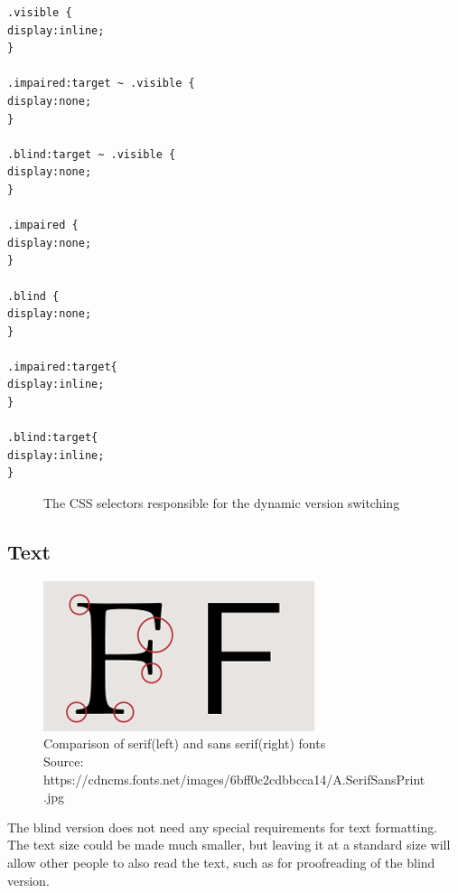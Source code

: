 \vspace{1cm}
\begin{lstlisting}
.visible {
display:inline; 
}

.impaired:target ~ .visible {
display:none; 
}

.blind:target ~ .visible {
display:none; 
}

.impaired {
display:none; 
}

.blind {
display:none; 
}

.impaired:target{
display:inline; 
}

.blind:target{
display:inline; 
}
\end{lstlisting}
\vspace{-0.2cm}
\begin{figure}[H]

	\caption{The CSS selectors responsible for the dynamic version switching}
	\label{fig:css_selector}
\end{figure}

\subsection{Text}

\begin{figure}[H]
	
	\begin{center}
		\includegraphics[width=\linewidth/2]{figures/sansSerif.jpg}
	\end{center}
	
	
	\caption{Comparison of serif(left) and sans serif(right) fonts
		\\Source: https://cdncms.fonts.net/images/6bff0c2cdbbcca14/A.SerifSansPrint.jpg}
	\label{fig:sansSerif}
\end{figure}

The blind version does not need any special requirements for text formatting. The text size could be made much smaller, but leaving it at a standard size will allow other people to also read the text, such as for proofreading of the blind version.

